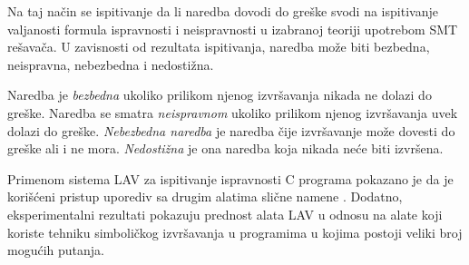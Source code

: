 \documentclass[12pt,oneside]{memoir}
\begin{document}
Na taj način se ispitivanje da li naredba dovodi do greške svodi na ispitivanje valjanosti formula ispravnosti i neispravnosti u izabranoj teoriji upotrebom SMT rešavača. U zavisnosti od rezultata ispitivanja, naredba može biti bezbedna, neispravna, nebezbedna i nedostižna. \par 
Naredba je \emph{bezbedna}	ukoliko prilikom njenog izvršavanja nikada ne dolazi do greške. Naredba se smatra \emph{neispravnom} ukoliko prilikom njenog izvršavanja uvek dolazi do greške. \emph{Nebezbedna naredba} je naredba čije izvršavanje može dovesti do greške ali i ne mora. \emph{Nedostižna} je ona naredba koja nikada neće biti izvršena.

\par
Primenom sistema LAV za ispitivanje ispravnosti C programa pokazano je da je korišćeni pristup uporediv sa drugim alatima slične namene \cite{vstteLAV12}.  Dodatno, eksperimentalni rezultati pokazuju prednost alata LAV u odnosu na alate koji koriste tehniku simboličkog izvršavanja u programima u kojima postoji veliki broj mogućih putanja. 
\end{document}
